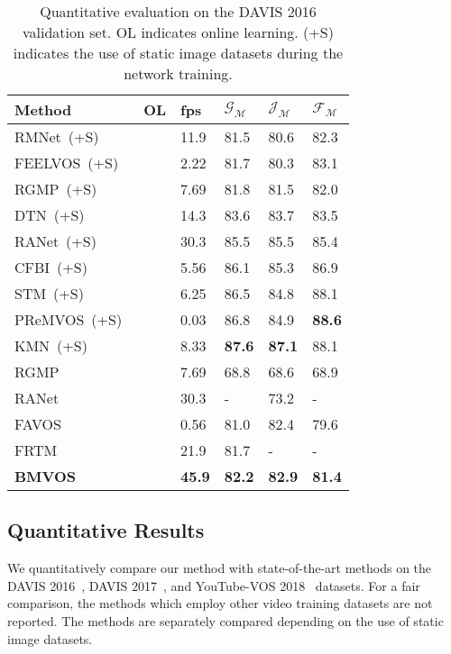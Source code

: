 \documentclass[10pt,twocolumn,letterpaper]{article}
\begin{document}
	
	\begin{table}
		\centering 
		\caption{Quantitative evaluation on the DAVIS 2016 validation set. OL indicates online learning. (+S) indicates the use of static image datasets during the network training.}
		\vspace{2mm}
		\small
		\begin{tabular}{lP{0.58cm}P{0.58cm}P{0.58cm}P{0.58cm}P{0.58cm}}
			\toprule
			Method &OL &fps &$\mathcal{G}_\mathcal{M}$ &$\mathcal{J}_\mathcal{M}$ &$\mathcal{F}_\mathcal{M}$\\
			\midrule
			RMNet~(+S)~\cite{RMNet} & &11.9 &81.5 &80.6 &82.3\\
			FEELVOS~(+S)~\cite{FEELVOS} & &2.22 &81.7 &80.3 &83.1\\
			RGMP~(+S)~\cite{RGMP} & &7.69 &81.8 &81.5 &82.0\\
			DTN~(+S)~\cite{DTN} & &14.3 &83.6 &83.7 &83.5\\
			RANet~(+S)~\cite{RANet} & &30.3 &85.5 &85.5 &85.4\\
			CFBI~(+S)~\cite{CFBI} & &5.56 &86.1 &85.3 &86.9\\
			STM~(+S)~\cite{STM} & &6.25 &86.5 &84.8 &88.1\\
			PReMVOS~(+S)~\cite{PReMVOS} &\checkmark &0.03 &86.8 &84.9 &\textbf{88.6}\\
			KMN~(+S)~\cite{KMN} & &8.33 &\textbf{87.6} &\textbf{87.1} &88.1\\
			\midrule
			RGMP~\cite{RGMP} & &7.69 &68.8 &68.6 &68.9\\
			RANet~\cite{RANet} & &30.3 &- &73.2 &-\\
			FAVOS~\cite{FAVOS} & &0.56 &81.0 &82.4 &79.6\\
			FRTM~\cite{FRTM} &\checkmark &21.9 &81.7 &- &-\\
			\midrule
			\textbf{BMVOS} & &\textbf{45.9} &\textbf{82.2} &\textbf{82.9} &\textbf{81.4}\\
			\bottomrule
		\end{tabular}
		\label{Table:DAVIS16_val}
	\end{table}
	
	
	\subsection{Quantitative Results}
	\label{quantitative}
	We quantitatively compare our method with state-of-the-art methods on the DAVIS 2016~\cite{DAVIS2016}, DAVIS 2017~\cite{DAVIS2017}, and YouTube-VOS 2018~\cite{YTVOS} datasets. For a fair comparison, the methods which employ other video training datasets are not reported. The methods are separately compared depending on the use of static image datasets.
	
\end{document}

